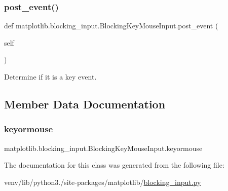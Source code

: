 \subsubsection{\texorpdfstring{post\+\_\+event()}{post\_event()}}
{\footnotesize\ttfamily def matplotlib.\+blocking\+\_\+input.\+Blocking\+Key\+Mouse\+Input.\+post\+\_\+event (\begin{DoxyParamCaption}\item[{}]{self }\end{DoxyParamCaption})}

\begin{DoxyVerb}Determine if it is a key event.\end{DoxyVerb}
 

\subsection{Member Data Documentation}
\mbox{\label{classmatplotlib_1_1blocking__input_1_1BlockingKeyMouseInput_a334fc03f82abaa83aea6a67e5682641e}} 
\subsubsection{\texorpdfstring{keyormouse}{keyormouse}}
{\footnotesize\ttfamily matplotlib.\+blocking\+\_\+input.\+Blocking\+Key\+Mouse\+Input.\+keyormouse}



The documentation for this class was generated from the following file\+:\begin{DoxyCompactItemize}
\item 
venv/lib/python3./site-\/packages/matplotlib/\hyperlink{blocking__input_8py}{blocking\+\_\+input.\+py}\end{DoxyCompactItemize}
